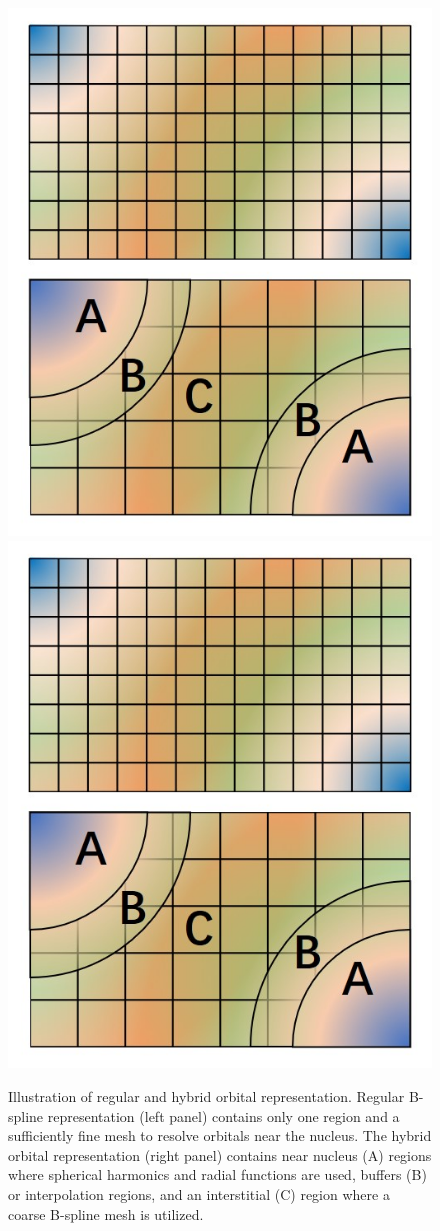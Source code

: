 \begin{figure}
\centering
\includegraphics[trim={0 152 0 0},clip,width=0.45\columnwidth]{figures/hybrid_new.jpg}
\qquad
\includegraphics[trim={0 2 0 150},clip,width=0.45\columnwidth]{figures/hybrid_new.jpg}
\caption{Illustration of regular and hybrid orbital representation. Regular B-spline representation (left panel) contains only one region and a sufficiently fine mesh to resolve orbitals near the nucleus. The hybrid orbital representation (right panel) contains near nucleus (A) regions where spherical harmonics and radial functions are used, buffers (B) or interpolation regions, and an interstitial (C) region where a coarse B-spline mesh is utilized.}
\label{fig:hybridrep}
\end{figure}

